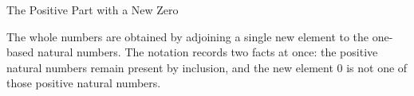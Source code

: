 
\label{sec:definition-of-whole-numbers}
\begin{topicbox}{The Positive Part with a New Zero}
\begin{exposition}
The whole numbers are obtained by adjoining a single new element to the
one-based natural numbers. The notation records two facts at once: the
positive natural numbers remain present by inclusion, and the new element
$0$ is not one of those positive natural numbers.
\end{exposition}
\end{topicbox}
